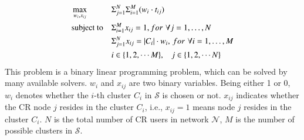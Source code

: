 \documentclass[10pt,journal,compsoc]{IEEEtran}
\theoremstyle{mytheoremstyle}
\theoremstyle{mytheoremstyle}
\theoremstyle{mytheoremstyle}
\newcommand{\ie}{i.e., }
\newcommand{\bigO}{\ensuremath{\mathcal{O}}}%
\begin{document}
 







\begin{equation}
\begin{aligned}
     &\max\limits_{w_i, x_{ij}} && \Sigma_{j=1}^N\Sigma_{i=1}^M (w_i\cdot t_{ij}) \\
     &\text{subject to}   && \Sigma_{i=1}^M x_{ij} = 1, for\,\,\forall j=1, \ldots, N \\
   &&& \Sigma_{j=1}^N x_{ij} = |C_i|\cdot w_i,\, for\,\,\forall i=1, \ldots, M \\
   &&& i\in \{1,2, \cdots M\}, \hspace{0.3cm} j\in \{1,2,\cdots N\}
\end{aligned}
\label{centralized_opt}
\end{equation}
This problem is a binary linear programming problem, which can be solved by many available solvers.
$w_i$ and $x_{ij}$ are two binary variables.
Being either 1 or 0, $w_i$ denotes whether the $i$-th cluster $C_i$ in $\mathcal{S}$ is chosen or not.
$x_{ij}$ indicates whether the CR node $j$ resides in the cluster $C_i$, \ie $x_{ij}=1$ means node $j$ resides in the cluster $C_i$. 
$N$ is the total number of CR users in network $\mathcal{N}$, $M$ is the number of possible clusters in $\mathcal{S}$.
\end{document}
